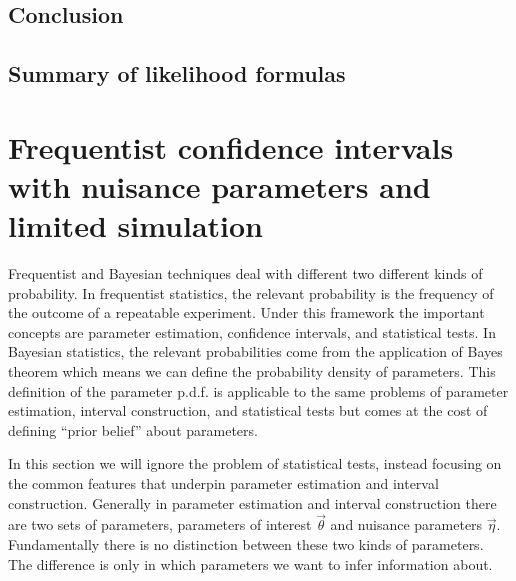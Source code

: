 \subsection{Conclusion\label{sec:llhconclusion}}
\begingroup
\graphicspath{{results/mcllh_paper/}}

\endgroup

\subsection{Summary of likelihood formulas\label{sec:llhtable}}
\begingroup
\graphicspath{{results/mcllh_paper/}}

\endgroup
\FloatBarrier
\section{Frequentist confidence intervals with nuisance parameters and limited simulation}\label{sec:low_stats_confidence_intervals}

Frequentist and Bayesian techniques deal with different two different kinds of probability.
In frequentist statistics, the relevant probability is the frequency of the outcome of a repeatable experiment.
Under this framework the important concepts are parameter estimation, confidence intervals, and statistical tests.
In Bayesian statistics, the relevant probabilities come from the application of Bayes theorem which means we can define the probability density of parameters.
This definition of the parameter p.d.f. is applicable to the same problems of parameter estimation, interval construction, and statistical tests but comes at the cost of defining ``prior belief'' about parameters.

In this section we will ignore the problem of statistical tests, instead focusing on the common features that underpin parameter estimation and interval construction.
Generally in parameter estimation and interval construction there are two sets of parameters, parameters of interest $\vec\theta$ and nuisance parameters $\vec\eta$.
Fundamentally there is no distinction between these two kinds of parameters.
The difference is only in which parameters we want to infer information about.

